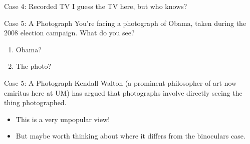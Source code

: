 \documentclass[
  17pt,
  letterpaper,
  ignorenonframetext,
  aspectratio=169,
]{beamer}
\providecommand{\tightlist}{%
  \setlength{\itemsep}{0pt}\setlength{\parskip}{0pt}}\usepackage{longtable,booktabs,array}
\begin{document}
\begin{frame}{Case 4: Recorded TV}
\protect\hypertarget{case-4-recorded-tv-1}{}
I guess the TV here, but who knows?
\end{frame}

\begin{frame}{Case 5: A Photograph}
\protect\hypertarget{case-5-a-photograph}{}
You're facing a photograph of Obama, taken during the 2008 election
campaign. What do you see?

\begin{enumerate}[<+->]
\tightlist
\item
  Obama?
\item
  The photo?
\end{enumerate}
\end{frame}

\begin{frame}{Case 5: A Photograph}
\protect\hypertarget{case-5-a-photograph-1}{}
Kendall Walton (a prominent philosopher of art now emiritus here at UM)
has argued that photographs involve directly seeing the thing
photographed.

\begin{itemize}[<+->]
\tightlist
\item
  This is a very unpopular view!
\item
  But maybe worth thinking about where it differs from the binoculars
  case.
\end{itemize}
\end{frame}
\end{document}
